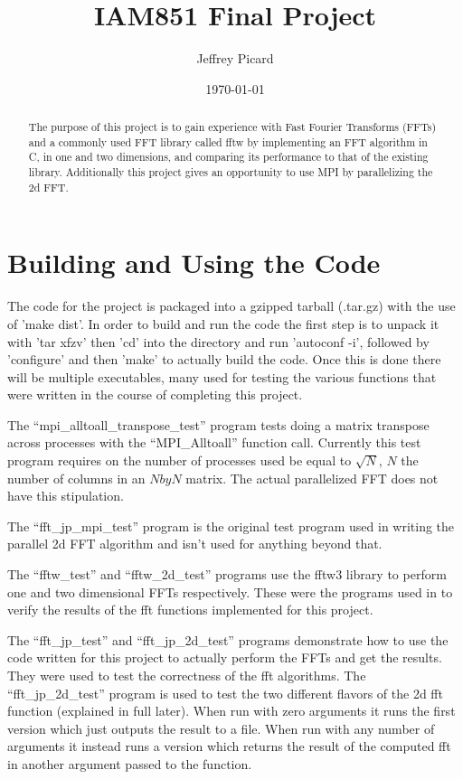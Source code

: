 \documentclass[12pt]{article}
\date{\small\today} \title{IAM851 Final Project} \author{Jeffrey Picard}
\begin{document}
\maketitle


\begin{abstract}
The purpose of this project is to gain experience with Fast Fourier Transforms (FFTs) and a commonly used FFT library called fftw by implementing an FFT
algorithm in C, in one and two dimensions, and comparing its performance to that of the existing library. Additionally this project gives an opportunity 
to use MPI by parallelizing the 2d FFT.
\end{abstract}


\section{Building and Using the Code}
The code for the project is packaged into a gzipped tarball (.tar.gz) with the use of 'make dist'. In order to build and run the code the first step
is to unpack it with 'tar xfzv' then 'cd' into the directory and run 'autoconf -i', followed by 'configure' and then 'make' to actually build the code.
Once this is done there will be multiple executables, many used for testing the various functions that were written in the course of completing this 
project. 

The ``mpi\_alltoall\_transpose\_test'' program tests doing a matrix transpose across processes with the ``MPI\_Alltoall'' function call. Currently
this test program requires on the number of processes used be equal to $\sqrt{N}$, $N$ the number of columns in an $N by N$ matrix. The actual 
parallelized FFT does not have this stipulation.

The ``fft\_jp\_mpi\_test'' program is the original test program used in writing the parallel 2d FFT algorithm and isn't used for anything beyond that.

The ``fftw\_test'' and ``fftw\_2d\_test'' programs use the fftw3 library to perform one and two dimensional FFTs respectively. These were the programs
used in to verify the results of the fft functions implemented for this project.

The ``fft\_jp\_test'' and ``fft\_jp\_2d\_test'' programs demonstrate how to use the code written for this project to actually perform the FFTs and
get the results. They were used to test the correctness of the fft algorithms. The ``fft\_jp\_2d\_test'' program is used to test the two different
flavors of the 2d fft function (explained in full later). When run with zero arguments it runs the first version which just outputs the result to 
a file. When run with any number of arguments it instead runs a version which returns the result of the computed fft in another argument passed to the
function.
\end{document}
